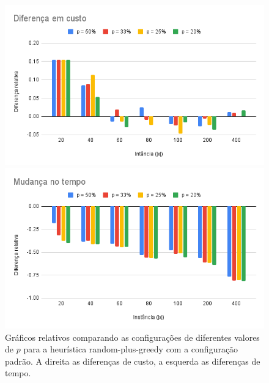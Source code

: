 \documentclass[11pt]{article}
\begin{document}
\begin{figure}
\begin{multicols}{2}
    \includegraphics[width=\linewidth]{custo.png}\par
    \includegraphics[width=\linewidth]{tempo.png}\par
    \end{multicols}
\caption{Gráficos relativos comparando as configurações de diferentes valores de $p$ para a heurística random-plus-greedy com a configuração padrão. A direita as diferenças de custo, a esquerda as diferenças de tempo.}
\label{graficos_p}
\end{figure}

\printbibliography
\end{document}
